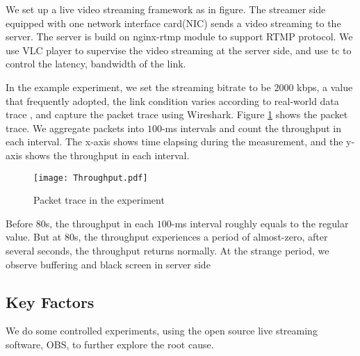 
\iffalse

We set up a live video streaming framework as in figure. The streamer side equipped with one network interface card(NIC) sends a video streaming to the server. The server is build on nginx-rtmp module to support RTMP protocol. We use VLC player to supervise the video streaming at the server side, and use tc to control the latency, bandwidth of the link.

In the example experiment, we set the streaming bitrate to be $2000$ kbps, a value that frequently adopted, the link condition varies according to real-world data trace \cite{iitkgp-apptraffic-20151126}, and capture the packet trace using Wireshark. Figure \ref{fig_trace} shows the packet trace. We aggregate packets into $100$-ms intervals and count the throughput in each interval. The x-axis shows time elapsing during the measurement, and the y-axis shows the throughput in each interval.

\begin{figure}[t]
\centering
\texttt{[image: Throughput.pdf]}
\vspace{-0.08in}
\caption{Packet trace in the experiment}
\vspace{-0.1in}
\label{fig_trace}
\end{figure}

Before $80$s, the throughput in each $100$-ms interval roughly equals to the regular value. But at $80$s, the throughput experiences a period of almost-zero, after several seconds, the throughput returns normally. At the strange period, we observe buffering and black screen in server side

\subsection{Key Factors}
We do some controlled experiments, using the open source live streaming software, OBS, to further explore the root cause.
